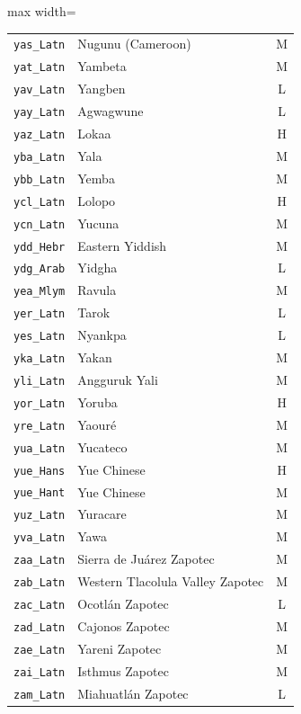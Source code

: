 {\begin{adjustbox}{max width=\textwidth}
\begin{tabular}{llc}
        \texttt{yas\_Latn} & Nugunu (Cameroon) & M \\
        \texttt{yat\_Latn} & Yambeta & M \\
        \texttt{yav\_Latn} & Yangben & L \\
        \texttt{yay\_Latn} & Agwagwune & L \\
        \texttt{yaz\_Latn} & Lokaa & H \\
        \texttt{yba\_Latn} & Yala & M \\
        \texttt{ybb\_Latn} & Yemba & M \\
        \texttt{ycl\_Latn} & Lolopo & H \\
        \texttt{ycn\_Latn} & Yucuna & M \\
        \texttt{ydd\_Hebr} & Eastern Yiddish & M \\
        \texttt{ydg\_Arab} & Yidgha & L \\
        \texttt{yea\_Mlym} & Ravula & M \\
        \texttt{yer\_Latn} & Tarok & L \\
        \texttt{yes\_Latn} & Nyankpa & L \\
        \texttt{yka\_Latn} & Yakan & M \\
        \texttt{yli\_Latn} & Angguruk Yali & M \\
        \texttt{yor\_Latn} & Yoruba & H \\
        \texttt{yre\_Latn} & Yaouré & M \\
        \texttt{yua\_Latn} & Yucateco & M \\
        \texttt{yue\_Hans} & Yue Chinese & H \\
        \texttt{yue\_Hant} & Yue Chinese & M \\
        \texttt{yuz\_Latn} & Yuracare & M \\
        \texttt{yva\_Latn} & Yawa & M \\
        \texttt{zaa\_Latn} & Sierra de Juárez Zapotec & M \\
        \texttt{zab\_Latn} & Western Tlacolula Valley Zapotec & M \\
        \texttt{zac\_Latn} & Ocotlán Zapotec & L \\
        \texttt{zad\_Latn} & Cajonos Zapotec & M \\
        \texttt{zae\_Latn} & Yareni Zapotec & M \\
        \texttt{zai\_Latn} & Isthmus Zapotec & M \\
        \texttt{zam\_Latn} & Miahuatlán Zapotec & L \\

\end{tabular}
\end{adjustbox}}
